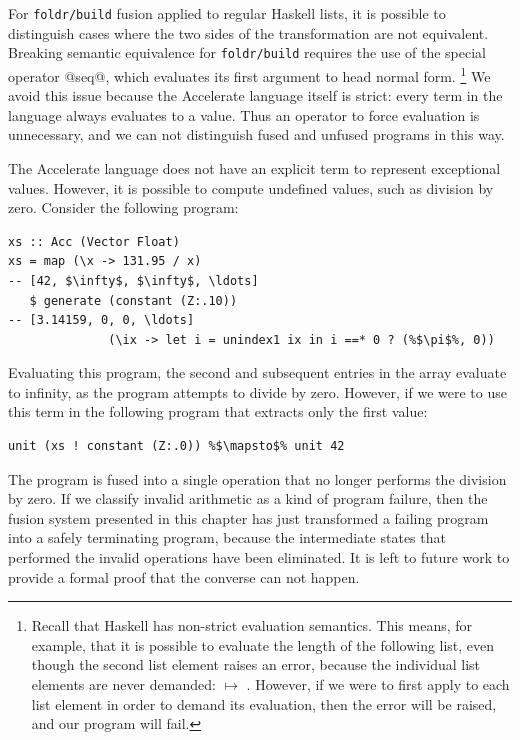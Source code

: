 For \texttt{foldr/build} fusion applied to regular Haskell lists, it is possible
to distinguish cases where the two sides of the transformation are not
equivalent. Breaking semantic equivalence for \texttt{foldr/build} requires the
use of the special operator @seq@, which evaluates its first argument to head
normal form.%
\footnote{Recall that Haskell has non-strict evaluation semantics. This means,
for example, that it is possible to evaluate the length of the following list,
even though the second list element raises an error, because the individual list
elements are never demanded:  $\mapsto$
. However, if we were to first apply  to each list
element in order to demand its evaluation, then the error will be raised, and
our program will fail.}
We avoid this issue because the Accelerate language itself is strict: every term
in the language always evaluates to a value. Thus an operator to force
evaluation is unnecessary, and we can not distinguish fused and unfused programs
in this way.

The Accelerate language does not have an explicit term to represent exceptional
values. However, it is possible to compute undefined values, such as division by
zero. Consider the following program:
%
\begin{lstlisting}[style=haskell]
xs :: Acc (Vector Float)
xs = map (\x -> 131.95 / x)                                             -- [42, $\infty$, $\infty$, \ldots]
   $ generate (constant (Z:.10))                                        -- [3.14159, 0, 0, \ldots]
              (\ix -> let i = unindex1 ix in i ==* 0 ? (%$\pi$%, 0))
\end{lstlisting}
%
Evaluating this program, the second and subsequent entries in the array evaluate
to infinity, as the program attempts to divide by zero. However, if we were to
use this term in the following program that extracts only the first value:
%
\begin{lstlisting}[style=haskell]
unit (xs ! constant (Z:.0)) %$\mapsto$% unit 42
\end{lstlisting}
%
The program is fused into a single operation that no longer performs the
division by zero. If we classify invalid arithmetic as a kind of program
failure, then the fusion system presented in this chapter has just transformed a
failing program into a safely terminating program, because the intermediate
states that performed the invalid operations have been eliminated. It is left to
future work to provide a formal proof that the converse can not happen.


